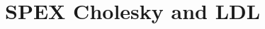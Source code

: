 \documentclass[12pt,oneside]{book}
\theoremstyle{definition}
\begin{document}
\begin{comment}
\end{itemize}

After all usage of the SPEX routines is finished, \verb|SPEX_finalize()|
must be called (Section \ref{ss:SPEX_finalize}) to finalize usage of the
library.


\cprotect\subsection{Examples}
\label{s:Using:Examples}
The \verb|SPEX/SPEX/SPEX_Left_LU/Demo| folder contains three sample C codes
which utilize SPEX. These files demonstrate the usage of SPEX as
follows:

\begin{itemize}
\item \verb|example.c|: This example generates a random dense $50 \times 50$
matrix and a random dense $50 \times 1$ right hand side vector $b$ and
solves the linear system. In this function, the \verb|SPEX_Left_LU_backslash|
function is used; and the output is given as a double matrix.

\item \verb|example2.c|: This example reads in a matrix stored in triplet
format from the \verb|ExampleMats| folder. Additionally, it reads in a
right hand side vector from this folder and solves the associated linear system
via the \verb|SPEX_Left_LU_backslash| function, and, the solution is given as a matrix
of rational numbers.

\item \verb|spexlu_demo.c|: This example reads in a matrix and right hand side
vector from a file and solves the linear system $A x = b$
using the techniques discussed in Section \ref{s:Using:expert}. This file also
allows command line arguments (discussed in \verb|README.md|) and can be used
to replicate the results from \cite{lourenco2019exact}.

\end{itemize}
\end{comment}


\chapter{SPEX Cholesky and LDL}\vspace{-0.75in} \label{ch:Chol}
\end{document}

